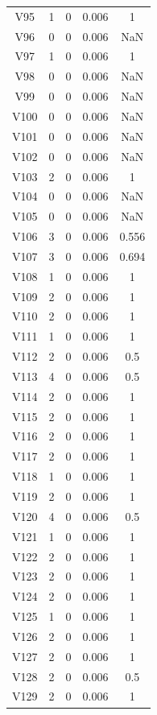 \documentclass[a4paper, 12pt, openright, oneside, german, french, english, brazil]{abntex2}
\begin{document}
\begin{SingleSpace}
\begin{footnotesize}
\begin{center}
\begin{longtable}{c c c c c}
					V95 & 1 & 0 & 0.006 & 1 \\ 
					V96 & 0 & 0 & 0.006 & NaN \\ 
					V97 & 1 & 0 & 0.006 & 1 \\ 
					V98 & 0 & 0 & 0.006 & NaN \\ 
					V99 & 0 & 0 & 0.006 & NaN \\ 
					V100 & 0 & 0 & 0.006 & NaN \\ 
					V101 & 0 & 0 & 0.006 & NaN \\ 
					V102 & 0 & 0 & 0.006 & NaN \\ 
					V103 & 2 & 0 & 0.006 & 1 \\ 
					V104 & 0 & 0 & 0.006 & NaN \\ 
					V105 & 0 & 0 & 0.006 & NaN \\ 
					V106 & 3 & 0 & 0.006 & 0.556 \\ 
					V107 & 3 & 0 & 0.006 & 0.694 \\ 
					V108 & 1 & 0 & 0.006 & 1 \\ 
					V109 & 2 & 0 & 0.006 & 1 \\ 
					V110 & 2 & 0 & 0.006 & 1 \\ 
					V111 & 1 & 0 & 0.006 & 1 \\ 
					V112 & 2 & 0 & 0.006 & 0.5 \\ 
					V113 & 4 & 0 & 0.006 & 0.5 \\ 
					V114 & 2 & 0 & 0.006 & 1 \\ 
					V115 & 2 & 0 & 0.006 & 1 \\ 
					V116 & 2 & 0 & 0.006 & 1 \\ 
					V117 & 2 & 0 & 0.006 & 1 \\ 
					V118 & 1 & 0 & 0.006 & 1 \\ 
					V119 & 2 & 0 & 0.006 & 1 \\ 
					V120 & 4 & 0 & 0.006 & 0.5 \\ 
					V121 & 1 & 0 & 0.006 & 1 \\ 
					V122 & 2 & 0 & 0.006 & 1 \\ 
					V123 & 2 & 0 & 0.006 & 1 \\ 
					V124 & 2 & 0 & 0.006 & 1 \\ 
					V125 & 1 & 0 & 0.006 & 1 \\ 
					V126 & 2 & 0 & 0.006 & 1 \\ 
					V127 & 2 & 0 & 0.006 & 1 \\ 
					V128 & 2 & 0 & 0.006 & 0.5 \\ 
					V129 & 2 & 0 & 0.006 & 1 \\ 

\end{longtable}
\end{center}
\end{footnotesize}
\end{SingleSpace}
\end{document}

